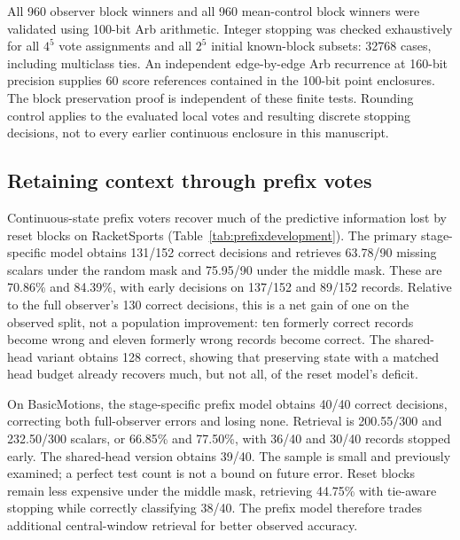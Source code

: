 \documentclass[11pt,a4paper]{article}
\theoremstyle{definition}\newtheorem{definition}[theorem]{Definition}
\begin{document}
All 960 observer block winners and all 960 mean-control block winners were validated using 100-bit Arb arithmetic. Integer stopping was checked exhaustively for all $4^5$ vote assignments and all $2^5$ initial known-block subsets: 32768 cases, including multiclass ties. An independent edge-by-edge Arb recurrence at 160-bit precision supplies 60 score references contained in the 100-bit point enclosures. The block preservation proof is independent of these finite tests. Rounding control applies to the evaluated local votes and resulting discrete stopping decisions, not to every earlier continuous enclosure in this manuscript.

\subsection{Retaining context through prefix votes}\label{sec:prefixresults}
\begin{table}[!htbp]\centering\small
\caption{Previously examined tasks: all declared classifier families. BA is balanced accuracy. Random and Middle give the mean percentage of initially missing scalars retrieved; Stream gives the mean percentage of the full record observed from its start. Tie-aware stopping preserves each family's own complete prediction. The full observer is a full-read cost baseline.}
\label{tab:prefixdevelopment}
\end{table}
Continuous-state prefix voters recover much of the predictive information lost by reset blocks on RacketSports (Table~\ref{tab:prefixdevelopment}). The primary stage-specific model obtains 131/152 correct decisions and retrieves 63.78/90 missing scalars under the random mask and 75.95/90 under the middle mask. These are 70.86\% and 84.39\%, with early decisions on 137/152 and 89/152 records. Relative to the full observer's 130 correct decisions, this is a net gain of one on the observed split, not a population improvement: ten formerly correct records become wrong and eleven formerly wrong records become correct. The shared-head variant obtains 128 correct, showing that preserving state with a matched head budget already recovers much, but not all, of the reset model's deficit.

On BasicMotions, the stage-specific prefix model obtains 40/40 correct decisions, correcting both full-observer errors and losing none. Retrieval is 200.55/300 and 232.50/300 scalars, or 66.85\% and 77.50\%, with 36/40 and 30/40 records stopped early. The shared-head version obtains 39/40. The sample is small and previously examined; a perfect test count is not a bound on future error. Reset blocks remain less expensive under the middle mask, retrieving 44.75\% with tie-aware stopping while correctly classifying 38/40. The prefix model therefore trades additional central-window retrieval for better observed accuracy.
\end{document}
